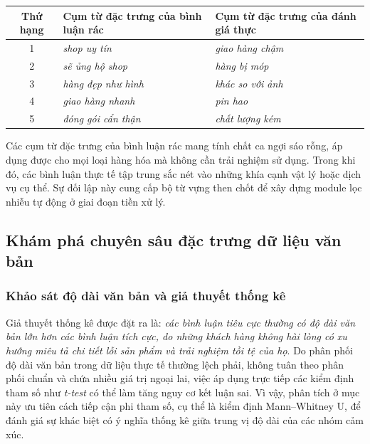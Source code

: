 \begin{center}
\renewcommand{\arraystretch}{1.3}
\begin{tabularx}{\textwidth}{|c|X|X|}
\hline
\rowcolor[HTML]{E8E8E8}
\textbf{Thứ hạng} & \textbf{Cụm từ đặc trưng của bình luận rác} & \textbf{Cụm từ đặc trưng của đánh giá thực} \\
\hline
1 & \textit{shop uy tín} & \textit{giao hàng chậm} \\
\hline
2 & \textit{sẽ ủng hộ shop} & \textit{hàng bị móp} \\
\hline
3 & \textit{hàng đẹp như hình} & \textit{khác so với ảnh} \\
\hline
4 & \textit{giao hàng nhanh} & \textit{pin hao} \\
\hline
5 & \textit{đóng gói cẩn thận} & \textit{chất lượng kém} \\
\hline
\end{tabularx}
\end{center}

Các cụm từ đặc trưng của bình luận rác mang tính chất ca ngợi sáo rỗng, áp dụng được cho mọi loại hàng hóa mà không cần trải nghiệm sử dụng. Trong khi đó, các bình luận thực tế tập trung sắc nét vào những khía cạnh vật lý hoặc dịch vụ cụ thể. Sự đối lập này cung cấp bộ từ vựng then chốt để xây dựng module lọc nhiễu tự động ở giai đoạn tiền xử lý.

\subsection{Khám phá chuyên sâu đặc trưng dữ liệu văn bản}

\subsubsection{Khảo sát độ dài văn bản và giả thuyết thống kê}

Giả thuyết thống kê được đặt ra là: \textit{các bình luận tiêu cực thường có độ dài văn bản lớn hơn các bình luận tích cực, do những khách hàng không hài lòng có xu hướng miêu tả chi tiết lỗi sản phẩm và trải nghiệm tồi tệ của họ}. Do phân phối độ dài văn bản trong dữ liệu thực tế thường lệch phải, không tuân theo phân phối chuẩn và chứa nhiều giá trị ngoại lai, việc áp dụng trực tiếp các kiểm định tham số như \textit{t-test} có thể làm tăng nguy cơ kết luận sai. Vì vậy, phân tích ở mục này ưu tiên cách tiếp cận phi tham số, cụ thể là kiểm định Mann--Whitney U, để đánh giá sự khác biệt có ý nghĩa thống kê giữa trung vị độ dài của các nhóm cảm xúc.

